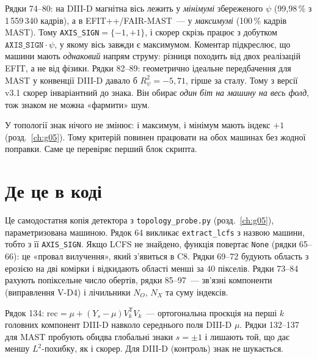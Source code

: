 
Рядки 74--80: на DIII-D магнітна вісь лежить у \emph{мінімумі} збереженого $\psi$ (99,98\,\% з 1\,559\,340 кадрів), а в EFIT++/FAIR-MAST~--- у \emph{максимумі} (100\,\% кадрів MAST). Тому \texttt{AXIS\_SIGN}$=\{-1,+1\}$, і скорер скрізь працює з добутком $\texttt{AXIS\_SIGN}\cdot\psi$, у якому вісь завжди є максимумом. Коментар підкреслює, що машини мають \emph{однаковий} напрям струму: різниця походить від двох реалізацій EFIT, а не від фізики. Рядки 82--89: геометрично ідеальне передбачення для MAST у конвенції DIII-D давало б $R^2_\psi=-5{,}71$, гірше за сталу. Тому з версії v3.1 скорер інваріантний до знака. Він обирає \emph{один біт на машину на весь фолд}, тож знаком не можна «фармити» шум.

У топології знак нічого не змінює: і максимум, і мінімум мають індекс $+1$ (розд.~\ref{ch:g05}). Тому критерій повинен працювати на обох машинах без жодної поправки. Саме це перевіряє перший блок скрипта.

\section{Де це в коді}\label{sec:g06-code}


Це самодостатня копія детектора з \texttt{topology\_probe.py} (розд.~\ref{ch:g05}), параметризована машиною. Рядок 64 викликає \texttt{extract\_lcfs} з назвою машини, тобто з її \texttt{AXIS\_SIGN}. Якщо LCFS не знайдено, функція повертає \texttt{None} (рядки 65--66): це «провал вилучення», який з'явиться в C8. Рядки 69--72 будують область з ерозією на дві комірки і відкидають області менші за 40 пікселів. Рядки 73--84 рахують попіксельне число обертів, рядки 85--97~--- зв'язні компоненти (виправлення V-D4) і лічильники $N_O$, $N_X$ та суму індексів.


Рядок 134: $\mathrm{rec}=\mu+(Y_s-\mu)V_k^{\mathsf T}V_k$~--- ортогональна проєкція на перші $k$ головних компонент DIII-D навколо середнього поля DIII-D $\mu$. Рядки 132--137 для MAST пробують обидва глобальні знаки $s=\pm1$ і лишають той, що дає меншу $L^2$-похибку, як і скорер. Для DIII-D (контроль) знак не шукається.

